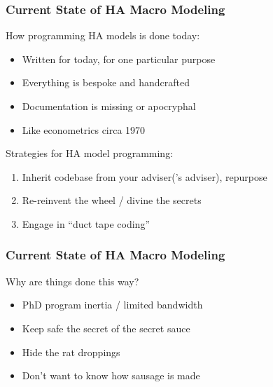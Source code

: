 \documentclass{beamer}
\newcommand{\bi}{\begin{itemize}}
\newcommand{\ei}{\end{itemize}}
\begin{document}
\begin{frame}
\frametitle{Current State of HA Macro Modeling}

\begin{block}{How programming HA models is done today:}
\bi
\item Written for today, for one particular purpose

\item Everything is bespoke and handcrafted

\item Documentation is missing or apocryphal

\item Like econometrics circa 1970

\ei
\end{block}



\begin{block}{Strategies for HA model programming:}
\begin{enumerate}
\item Inherit codebase from your adviser('s adviser), repurpose

\item Re-reinvent the wheel / divine the secrets

\item Engage in ``duct tape coding''
\end{enumerate}
\end{block}


\end{frame}



\begin{frame}
\frametitle{Current State of HA Macro Modeling}

\begin{block}{Why are things done this way?}
\bi
\item PhD program inertia / limited bandwidth

\item Keep safe the secret of the secret sauce

\item Hide the rat droppings

\item Don't want to know how sausage is made
\ei

\end{block}
\end{frame}
\end{document}
